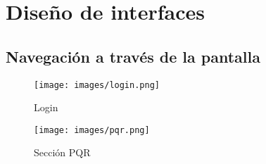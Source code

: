 \chapter{Dise\~no de interfaces}
\section{Navegaci\'on a trav\'es de la pantalla}
%
\begin{figure}[htbp]
	\centering
		\texttt{[image: images/login.png]}
	\caption{Login}
	\label{fig:logininterface}
\end{figure}%
\newpage%
%
\begin{figure}[htbp]
	\centering
		\texttt{[image: images/pqr.png]}
	\caption{Secci\'on PQR}
	\label{fig:pqrinterface}
\end{figure}%
\newpage%